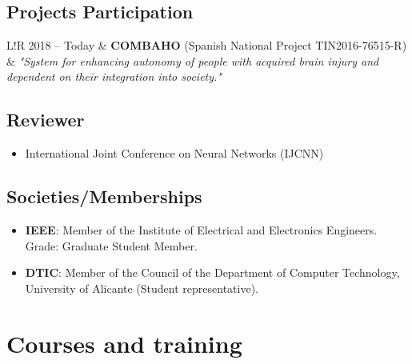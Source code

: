 \documentclass[8pt]{article}
\newcommand\VRule{\color{lightgray}\vrule width 0.5pt}
\begin{document}
\subsection*{Projects Participation}

\begin{tabular}{L!{\VRule}R}
	2018 -- Today & \textbf{COMBAHO} (Spanish National Project TIN2016-76515-R)\\
	& \textit{"System for enhancing autonomy of people with acquired brain injury and dependent on their integration into society."} \\
\end{tabular}

\subsection*{Reviewer}

\begin{itemize}
	\item International Joint Conference on Neural Networks (IJCNN)
\end{itemize}

\subsection*{Societies/Memberships}

\begin{itemize}
	\item \textbf{IEEE}: Member of the Institute of Electrical and Electronics Engineers. Grade: Graduate Student Member.
	\item \textbf{DTIC}: Member of the Council of the Department of Computer Technology, University of Alicante (Student representative).
\end{itemize}


\section*{Courses and training}
\end{document}
